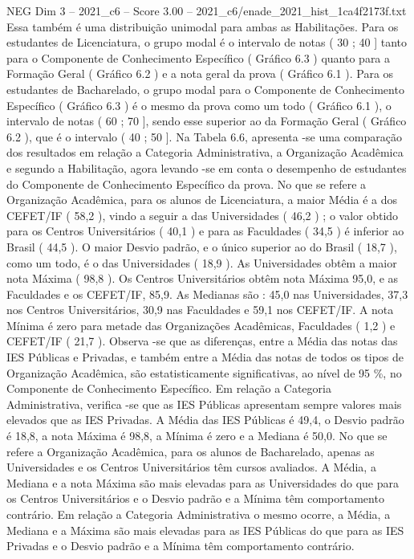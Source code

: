 \begin{textsample}{NEG Dim 3 – 2021\_c6 – Score 3.00 – 2021\_c6/enade\_2021\_hist\_1ca4f2173f.txt}
Essa também é uma distribuição unimodal para ambas as Habilitações.
Para os estudantes de Licenciatura, o grupo modal é o intervalo de notas ( 30 ; 40 ] tanto para o Componente de Conhecimento Específico ( Gráfico 6.3 ) quanto para a Formação Geral ( Gráfico 6.2 ) e a nota geral da prova ( Gráfico 6.1 ).
Para os estudantes de Bacharelado, o grupo modal para o Componente de Conhecimento Específico ( Gráfico 6.3 ) é o mesmo da prova como um todo ( Gráfico 6.1 ), o intervalo de notas ( 60 ; 70 ], sendo esse superior ao da Formação Geral ( Gráfico 6.2 ), que é o intervalo ( 40 ; 50 ].
Na Tabela 6.6, apresenta -se uma comparação dos resultados em relação a Categoria Administrativa, a Organização Acadêmica e segundo a Habilitação, agora levando -se em conta o desempenho de estudantes do Componente de Conhecimento Específico da prova.
No que se refere a Organização Acadêmica, para os alunos de Licenciatura, a maior Média é a dos CEFET/IF ( 58,2 ), vindo a seguir a das Universidades ( 46,2 ) ; o valor obtido para os Centros Universitários ( 40,1 ) e para as Faculdades ( 34,5 ) é inferior ao Brasil ( 44,5 ).
O maior Desvio padrão, e o único superior ao do Brasil ( 18,7 ), como um todo, é o das Universidades ( 18,9 ).
As Universidades obtêm a maior nota Máxima ( 98,8 ).
Os Centros Universitários obtêm nota Máxima 95,0, e as Faculdades e os CEFET/IF, 85,9.
As Medianas são : 45,0 nas Universidades, 37,3 nos Centros Universitários, 30,9 nas Faculdades e 59,1 nos CEFET/IF.
A nota Mínima é zero para metade das Organizações Acadêmicas, Faculdades ( 1,2 ) e CEFET/IF ( 21,7 ).
Observa -se que as diferenças, entre a Média das notas das IES Públicas e Privadas, e também entre a Média das notas de todos os tipos de Organização Acadêmica, são estatisticamente significativas, ao nível de 95 \%, no Componente de Conhecimento Específico.
Em relação a Categoria Administrativa, verifica -se que as IES Públicas apresentam sempre valores mais elevados que as IES Privadas.
A Média das IES Públicas é 49,4, o Desvio padrão é 18,8, a nota Máxima é 98,8, a Mínima é zero e a Mediana é 50,0.
No que se refere a Organização Acadêmica, para os alunos de Bacharelado, apenas as Universidades e os Centros Universitários têm cursos avaliados.
A Média, a Mediana e a nota Máxima são mais elevadas para as Universidades do que para os Centros Universitários e o Desvio padrão e a Mínima têm comportamento contrário.
Em relação a Categoria Administrativa o mesmo ocorre, a Média, a Mediana e a Máxima são mais elevadas para as IES Públicas do que para as IES Privadas e o Desvio padrão e a Mínima têm comportamento contrário.

\end{textsample}
